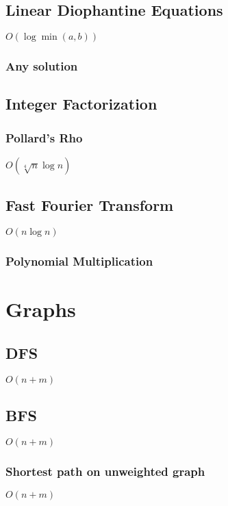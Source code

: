 \documentclass{article}
\begin{document}
\subsection{Linear Diophantine Equations}
$O(\log \min (a, b))$
\subsubsection{Any solution}


\subsection{Integer Factorization}
\subsubsection{Pollard's Rho}
$O(\sqrt[4]{n}\log n)$


\subsection{Fast Fourier Transform}
$O(n \log n)$

\subsubsection{Polynomial Multiplication}


\section{Graphs}
\subsection{DFS}
$O(n+m)$


\subsection{BFS}
$O(n+m)$


\subsubsection{Shortest path on unweighted graph}
$O(n+m)$

\end{document}
